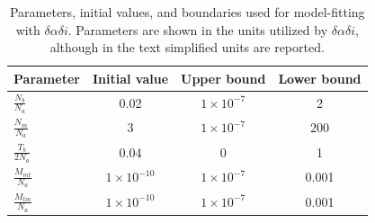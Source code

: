 \begin{table}
  \begin{center}
  \def\arraystretch{2}
  \begin{tabular}{l|c|c|c}
    \bf Parameter & \bf Initial value & \bf Upper bound & \bf Lower bound\\ \hline 
    $\frac{N_b}{N_a}$ & 0.02 & $1\times10^{-7}$ & 2 \\ 
    $\frac{N_{m}}{N_a}$ & 3 & $1\times10^{-7}$ & 200 \\
    $\frac{T_b}{2N_a}$ & 0.04 & 0  & 1 \\ 
    $\frac{M_{mt}}{N_a}$ & $1\times10^{-10}$ & $1\times10^{-7}$ & 0.001 \\
    $\frac{M_{tm}}{N_a}$ & $1\times10^{-10}$ & $1\times10^{-7}$ & 0.001 \\
  \end{tabular}
  \def\arraystretch{1} %
  \end{center}
    \caption{ Parameters, initial values, and boundaries used for model-fitting with $\delta\alpha\delta{i}$. Parameters are shown in the units utilized by $\delta\alpha\delta{i}$, although in the text simplified units are reported.    }\label{sTab:dadi}
\end{table}

